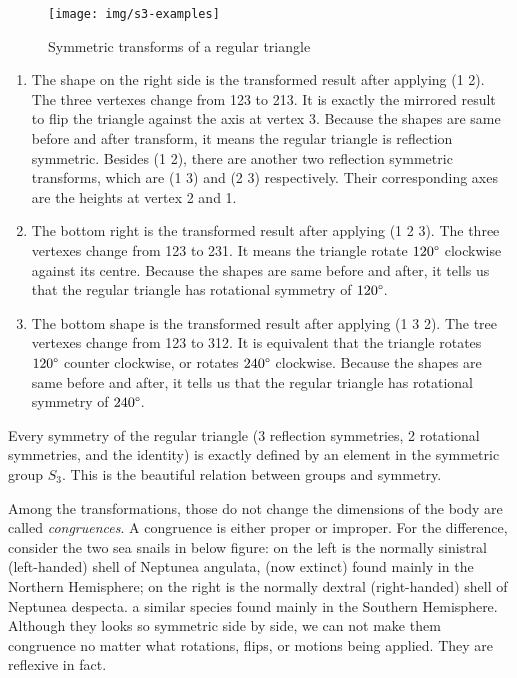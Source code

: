 \documentclass[b5paper]{article}
\begin{document}
\begin{figure}[htbp]
 \centering
 \texttt{[image: img/s3-examples]}
 \caption{Symmetric transforms of a regular triangle}
 \label{fig:S3-examples}
\end{figure}

\begin{enumerate}
\item The shape on the right side is the transformed result after applying (1 2). The three vertexes change from 123 to 213. It is exactly the mirrored result to flip the triangle against the axis at vertex 3. Because the shapes are same before and after transform, it means the regular triangle is reflection symmetric. Besides (1 2), there are another two reflection symmetric transforms, which are (1 3) and (2 3) respectively. Their corresponding axes are the heights at vertex 2 and 1.

\item The bottom right is the transformed result after applying (1 2 3). The three vertexes change from 123 to 231. It means the triangle rotate $120\degree$ clockwise against its centre. Because the shapes are same before and after, it tells us that the regular triangle has rotational symmetry of $120\degree$.

\item The bottom shape is the transformed result after applying (1 3 2). The tree vertexes change from 123 to 312. It is equivalent that the triangle rotates $120\degree$ counter clockwise, or rotates $240\degree$ clockwise. Because the shapes are same before and after, it tells us that the regular triangle has rotational symmetry of $240\degree$.

\end{enumerate}

Every symmetry of the regular triangle (3 reflection symmetries, 2 rotational symmetries, and the identity) is exactly defined by an element in the symmetric group $S_3$. This is the beautiful relation between groups and symmetry.

Among the transformations, those do not change the dimensions of the body are called {\em congruences}. A congruence is either proper or improper. For the difference, consider the two sea snails in below figure: on the left is the normally sinistral (left-handed) shell of Neptunea angulata, (now extinct) found mainly in the Northern Hemisphere; on the right is the normally dextral (right-handed) shell of Neptunea despecta. a similar species found mainly in the Southern Hemisphere. Although they looks so symmetric side by side, we can not make them congruence no matter what rotations, flips, or motions being applied. They are reflexive in fact.
\end{document}
